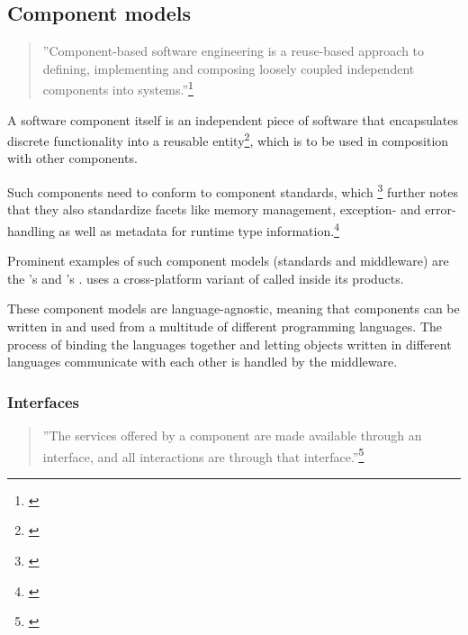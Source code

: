 \subsection{Component models}
\label{sec:ComponentModels}

\begin{quotation}
''Component-based software engineering is a reuse-based approach to defining, implementing and composing loosely coupled independent components into systems.''\footnote{\citep[460]{Sommerville}}
\end{quotation}

A software component itself is an independent piece of software that encapsulates discrete functionality into a reusable entity\footnote{\citep[3]{ComponentTechnology}}, which is to be used in composition with other components.

Such components need to conform to component standards, which \footnote{\citep[440]{Sommerville}}  further notes that they also standardize facets like memory management, exception- and error-handling as well as metadata for runtime type information.\footnote{\citep[8]{ComponentTechnology}}

Prominent examples of such component models (standards and middleware) are the 's  and 's .  uses a cross-platform variant of  called  inside its products.

These component models are language-agnostic, meaning that components can be written in and used from a multitude of different programming languages. The process of binding the languages together and letting objects written in different languages communicate with each other is handled by the middleware.

\subsubsection{Interfaces}

\begin{quotation}
''The services offered by a component are made available through an interface, and all interactions are through that interface.''\footnote{\citep[444]{Sommerville}}
\end{quotation}

